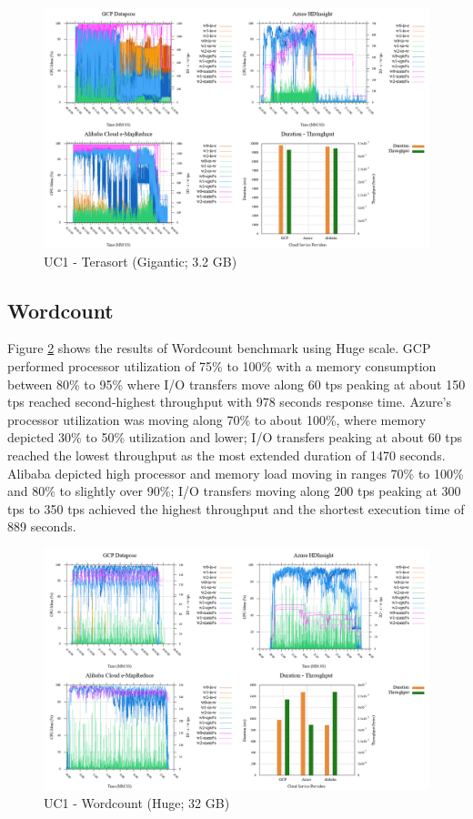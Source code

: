 \documentclass[review]{elsarticle}
\begin{document}
\begin{figure}[p]
	\caption{UC1 - Terasort (Gigantic; 3.2 GB)}
	\label{fig:uc1-tera-g-cmidt}
	\includegraphics[width=\textwidth]{uc1-tera-g-cmidt}
	\centering
\end{figure}

\subsection{Wordcount}
Figure \ref{fig:uc1-wrdcnt-h-cmidt} shows the results of Wordcount benchmark using Huge scale. GCP performed processor utilization of 75\% to 100\% with a memory consumption between 80\% to 95\% where I/O transfers move along 60 tps peaking at about 150 tps reached second-highest throughput with 978 seconds response time. Azure's processor utilization was moving along 70\% to about 100\%, where memory depicted 30\% to 50\% utilization and lower; I/O transfers peaking at about 60 tps reached the lowest throughput as the most extended duration of 1470 seconds. Alibaba depicted high processor and memory load moving in ranges 70\% to 100\% and 80\% to slightly over 90\%; I/O transfers moving along 200 tps peaking at 300 tps to 350 tps achieved the highest throughput and the shortest execution time of 889 seconds.

\begin{figure}[p]
	\caption{UC1 - Wordcount (Huge; 32 GB)}
	\label{fig:uc1-wrdcnt-h-cmidt}
	\includegraphics[width=\textwidth]{uc1-wrdcnt-h-cmidt}
	\centering
\end{figure}
\end{document}
